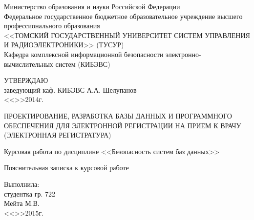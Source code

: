 \newpage
{}

\begin{center}
 Министерство образования и науки Российской Федерации\\
 Федеральное государственное бюджетное образовательное учреждение высшего профессионального образования\\
 <<ТОМСКИЙ ГОСУДАРСТВЕННЫЙ УНИВЕРСИТЕТ СИСТЕМ УПРАВЛЕНИЯ И РАДИОЭЛЕКТРОНИКИ>> (ТУСУР)\\
 Кафедра комплексной информационной безопасности электронно-вычислительных систем (КИБЭВС)\\
\end{center}

\vfill

\begin{flushright}
\begin{minipage}{0.45\textwidth}
 \begin{flushleft}
  УТВЕРЖДАЮ\\
  заведующий каф. КИБЭВС
  \underline{\hspace{3cm}}А.А. Шелупанов \\
  <<\underline{\hspace{1cm}}>>\underline{\hspace{3cm}}2014г.\\
 \end{flushleft}
\end{minipage}
\end{flushright}

\vfill

\begin{center}
ПРОЕКТИРОВАНИЕ, РАЗРАБОТКА БАЗЫ ДАННЫХ И ПРОГРАММНОГО ОБЕСПЕЧЕНИЯ ДЛЯ ЭЛЕКТРОННОЙ РЕГИСТРАЦИИ НА ПРИЕМ К ВРАЧУ 
(ЭЛЕКТРОННАЯ РЕГИСТРАТУРА)

Курсовая работа по дисциплине <<Безопасность систем баз данных>>

Пояснительная записка к курсовой работе
\end{center}

\vfill
\begin{flushright}
\begin{minipage}{0.45\textwidth}
 \begin{flushleft}
  Выполнила: \\
  студентка гр. 722 \\
  \underline{\hspace{3cm}}Мейта М.В. \\
  <<\underline{\hspace{1cm}}>>\underline{\hspace{3cm}}2015г.\\
 \end{flushleft}
\end{minipage}
\end{flushright}

